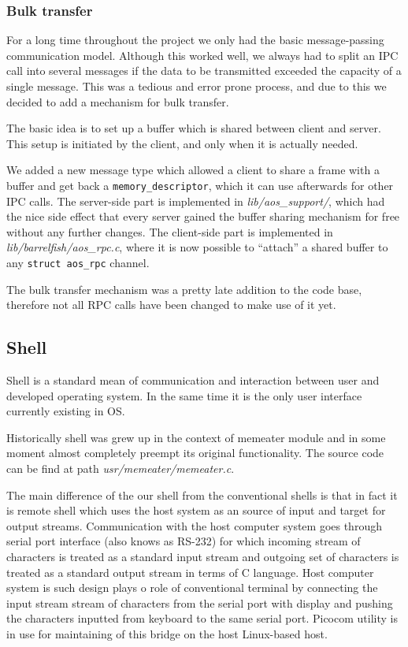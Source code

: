 \documentclass[a4paper,10pt]{article}
\newcommand{\filepath}[1]{\emph{ #1}}
\begin{document}
\subsubsection{Bulk transfer}

For a long time throughout the project we only had the basic message-passing communication model.
Although this worked well, we always had to split an IPC call into several messages if the data to be transmitted exceeded the capacity of a single message.
This was a tedious and error prone process, and due to this we decided to add a mechanism for bulk transfer.

The basic idea is to set up a buffer which is shared between client and server.
This setup is initiated by the client, and only when it is actually needed.

We added a new message type which allowed a client to share a frame with a buffer and get back a \lstinline!memory_descriptor!, which it can use afterwards for other IPC calls.
The server-side part is implemented in \filepath{lib/aos\_support/}, which had the nice side effect that every server gained the buffer sharing mechanism for free without any further changes.
The client-side part is implemented in \filepath{lib/barrelfish/aos\_rpc.c}, where it is now possible to ``attach'' a shared buffer to any \lstinline!struct aos_rpc! channel.

The bulk transfer mechanism was a pretty late addition to the code base, therefore not all RPC calls have been changed to make use of it yet.

\subsection{Shell}
	Shell is a standard mean of communication and interaction between user and developed operating system.
	In the same time it is the only user interface currently existing in OS.
	 
	Historically shell was grew up in the context of memeater module and in some moment almost completely preempt its original functionality. The source code can be find at path \filepath{usr/memeater/memeater.c}.
	
	The main difference of the our shell from the conventional shells is that in fact it is remote shell which uses the host system as an source of input and target for output streams. 
	Communication with the host computer system goes through serial port interface (also knows as RS-232) for which incoming stream of characters is treated as a standard input stream and outgoing set of characters is treated as a standard output stream in terms of C language. 
	Host computer system is such design plays o role of conventional terminal by connecting the input stream stream of characters from the serial port with display and pushing the characters inputted from keyboard to the same serial port.
	Picocom utility is in use for maintaining of this bridge on the host Linux-based host.
	
\end{document}
